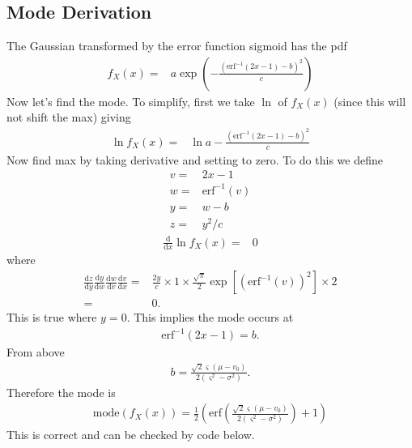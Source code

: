 \documentclass{article}
\begin{document}
\subsection*{Mode Derivation}
The Gaussian transformed by the error function sigmoid has the pdf
\begin{align}
	f_X(x)=& a\exp\left(-\frac{ \left(\mathrm{erf}^{-1}\left(2x-1\right) - b\right)^2}{c}\right)
\end{align}
Now let's find the mode. To simplify, first we take $\ln$ of $f_X(x)$ (since this will not shift the max) giving
\begin{align}
	\ln f_X(x)=& \ln a - \frac{ (\mathrm{erf}^{-1}\left(2x-1\right) - b)^2}{c}
\end{align}
Now find max by taking derivative and setting to zero. To do this we define
\begin{align}
	v =& 2x-1 \nonumber \\
	w =& \mathrm{erf}^{-1}(v) \nonumber \\
	y =& w-b \nonumber \\
	z =& y^2/c \nonumber
\end{align}
\begin{align}
	\frac{\mathrm{d}}{\mathrm{d}x} \ln f_X(x) =& 0
\end{align}
where
\begin{align}
	\frac{\mathrm{d}z}{\mathrm{d}y} \frac{\mathrm{d}y}{\mathrm{d}w} \frac{\mathrm{d}w}{\mathrm{d}v} \frac{\mathrm{d}v}{\mathrm{d}x} =& \frac{2y}{c} \times 1 \times \frac{\sqrt{\pi}}{2}\exp\left[\left(\mathrm{erf}^{-1}(v)\right)^2\right] \times 2 \\
	=& 0.
\end{align}
This is true where $y=0$. This implies the mode occurs at
\begin{align}
	\mathrm{erf}^{-1}(2x-1) = b.
\end{align}
From above
\begin{align}
	b = \frac{\sqrt{2}\varsigma\left(\mu-v_0\right)}{2\left(\varsigma^2-\sigma^2\right)}.
\end{align}
Therefore the mode is
\begin{align}
	\mathrm{mode}\left(f_X(x)\right) = \frac{1}{2}\left(\mathrm{erf}\left(\frac{\sqrt{2}\varsigma\left(\mu-v_0\right)}{2\left(\varsigma^2 - \sigma^2\right)}\right)+1\right)
\end{align}
This is correct and can be checked by code below.
\end{document}
